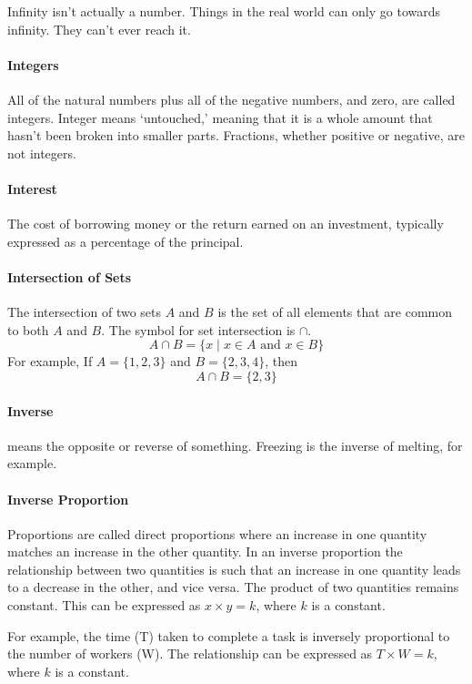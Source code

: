 \documentclass[12pt]{article}
\begin{document}
Infinity isn't actually a number. Things in the real world can only go towards infinity. They can't ever reach it.

\paragraph{Integers} 
All of the natural numbers plus all of the negative numbers, and zero, are called integers. Integer means ‘untouched,’ meaning that it is a whole amount that hasn't been broken into smaller parts. Fractions, whether positive or negative, are not integers.

\paragraph{Interest}
The cost of borrowing money or the return earned on an investment, typically expressed as a percentage of the principal.

\paragraph{Intersection of Sets}
The intersection of two sets \(A\) and \(B\) is the set of all elements that are common to both \(A\) and \(B\). The symbol for set intersection is \( \cap\).
\[ A \cap B = \{x \mid x \in A \text{ and } x \in B\} \]
For example, If \(A = \{1, 2, 3\}\) and \(B = \{2, 3, 4\}\), then \[ A \cap B = \{2, 3\} \]

\paragraph{Inverse} means the opposite or reverse of something. Freezing is the inverse of melting, for example.

\paragraph{Inverse Proportion}
Proportions are called direct proportions where an increase in one quantity matches an increase in the other quantity. In an inverse proportion the relationship between two quantities is such that an increase in one quantity leads to a decrease in the other, and vice versa. The product of two quantities remains constant. This can be expressed as $x\times y=k$, where $k$ is a constant.

For example, the time (T) taken to complete a task is inversely proportional to the number of workers (W). The relationship can be expressed as $T\times W=k$, where $k$ is a constant.
\end{document}
